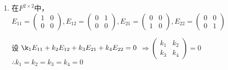 \begin{property}[线性空间的性质]
    \begin{example}
        \begin{enumerate}
            \item 在$F^{2 \times 2}$中，$
            E_{11} = {\left(
                \begin{array}{ccc}
                    1 & 0 \\
                    0 & 0
                \end{array}\right)},
            E_{12} = \left(
                \begin{array}{ccc}
                    0 & 1 \\
                    0 & 0
                \end{array}\right),
            E_{21} = \left(
                \begin{array}{ccc}
                    0 & 0 \\
                    1 & 0
                \end{array}\right),
            E_{22} = \left(
                \begin{array}{ccc}
                    0 & 0 \\
                    0 & 1
                \end{array}\right)$
                \begin{solutiontitle}
                    设 $\k_1 E_{11} + k_2 E_{12} + k_3 E_{21} + k_4 E_{22} = 0$
                    $\Rightarrow 
                    \left(\begin{array}{ccc}
                        k_1 & k_2 \\
                        k_3 & k_4
                    \end{array}\right) = 0$
                    $\therefore k_1 = k_2 = k_3 = k_4 = 0$
                \end{solutiontitle}


\end{enumerate}
\end{example}
\end{property}
